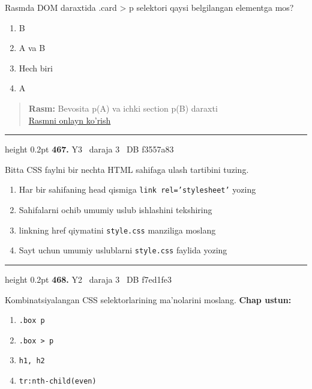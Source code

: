 \documentclass[10pt,a4paper,oneside]{article}
\begin{document}
\par
Rasmda DOM daraxtida .card \textgreater{} p selektori qaysi belgilangan elementga mos?
\begin{enumerate}[label=\Alph*),leftmargin=9mm]
\item B
\item A va B
\item Hech biri
\item A
\end{enumerate}
\begin{quote}\footnotesize\color{muted}\textbf{Rasm:} Bevosita p(A) va ichki section p(B) daraxti\\
\href{https://github.com/sarvar9417/attestatsiya/blob/main/public/graphics-web-v2/dom_tree.svg}{Rasmni onlayn ko'rish}
\end{quote}
\vspace{2mm}\hrule height 0.2pt \vspace{4mm}
\hypertarget{q467}{\textbf{\color{ink}467.}}  {\color{muted}\scriptsize Y3 \textbullet\ daraja 3 \textbullet\ DB f3557a83}
\par
Bitta CSS faylni bir nechta HTML sahifaga ulash tartibini tuzing.
\begin{enumerate}[label=\Alph*),leftmargin=9mm]
\item Har bir sahifaning head qismiga \texttt{link rel='stylesheet'} yozing
\item Sahifalarni ochib umumiy uslub ishlashini tekshiring
\item linkning href qiymatini \texttt{style.css} manziliga moslang
\item Sayt uchun umumiy uslublarni \texttt{style.css} faylida yozing
\end{enumerate}
\vspace{2mm}\hrule height 0.2pt \vspace{4mm}
\hypertarget{q468}{\textbf{\color{ink}468.}}  {\color{muted}\scriptsize Y2 \textbullet\ daraja 3 \textbullet\ DB f7ed1fe3}
\par
Kombinatsiyalangan CSS selektorlarining ma'nolarini moslang.
\textbf{\footnotesize Chap ustun:}
\begin{enumerate}[label=\arabic*),leftmargin=9mm]
\item \texttt{.box p}
\item \texttt{.box \textgreater{} p}
\item \texttt{h1, h2}
\item \texttt{tr:nth-child(even)}
\end{enumerate}
\end{document}
